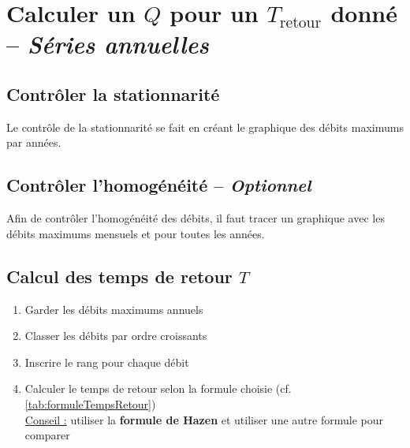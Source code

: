 \chapter{Calculer un $Q$ pour un $T_\text{retour}$ donné -- \textit{Séries annuelles}}



\section{Contrôler la stationnarité}
Le contrôle de la stationnarité se fait en créant le graphique des débits maximums par années. \\


\section{Contrôler l'homogénéité -- \textit{Optionnel}}
Afin de contrôler l'homogénéité des débits, il faut tracer un graphique avec les débits maximums mensuels et pour toutes les années. \\


\section{Calcul des temps de retour $T$}
\begin{enumerate}
    \item Garder les débits maximums annuels
    \item Classer les débits par ordre croissants
    \item Inscrire le rang pour chaque débit
    \item Calculer le temps de retour selon la formule choisie (cf. \ref{tab:formuleTempsRetour}) \\
    \underline{Conseil :} utiliser la \textbf{{\color{red} formule de Hazen}} et utiliser une autre formule pour comparer
\end{enumerate}


